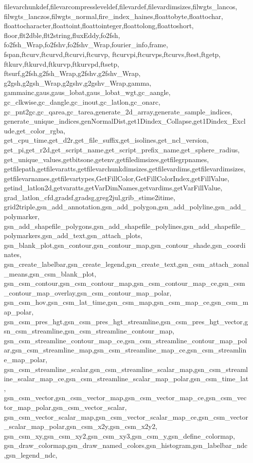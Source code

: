 {{	filevarchunkdef,filevarcompressleveldef,filevardef,filevardimsizes,filwgts_lancos,
	filwgts_lanczos,filwgts_normal,fire_index_haines,floattobyte,floattochar,
	floattocharacter,floattoint,floattointeger,floattolong,floattoshort,
	floor,flt2dble,flt2string,fluxEddy,fo2fsh,
	fo2fsh_Wrap,fo2fshv,fo2fshv_Wrap,fourier_info,frame,
	fspan,ftcurv,ftcurvd,ftcurvi,ftcurvp,
	ftcurvpi,ftcurvps,ftcurvs,ftest,ftgetp,
	ftkurv,ftkurvd,ftkurvp,ftkurvpd,ftsetp,
	ftsurf,g2fsh,g2fsh_Wrap,g2fshv,g2fshv_Wrap,
	g2gsh,g2gsh_Wrap,g2gshv,g2gshv_Wrap,gamma,
	gammainc,gaus,gaus_lobat,gaus_lobat_wgt,gc_aangle,
	gc_clkwise,gc_dangle,gc_inout,gc_latlon,gc_onarc,
	gc_pnt2gc,gc_qarea,gc_tarea,generate_2d_array,generate_sample_indices,
	generate_unique_indices,genNormalDist,get1Dindex_Collapse,get1Dindex_Exclude,get_color_rgba,
	get_cpu_time,get_d2r,get_file_suffix,get_isolines,get_ncl_version,
	get_pi,get_r2d,get_script_name,get_script_prefix_name,get_sphere_radius,
	get_unique_values,getbitsone,getenv,getfiledimsizes,getfilegrpnames,
	getfilepath,getfilevaratts,getfilevarchunkdimsizes,getfilevardims,getfilevardimsizes,
	getfilevarnames,getfilevartypes,GetFillColor,GetFillColorIndex,getFillValue,
	getind_latlon2d,getvaratts,getVarDimNames,getvardims,getVarFillValue,
	grad_latlon_cfd,gradsf,gradsg,greg2jul,grib_stime2itime,
	grid2triple,gsn_add_annotation,gsn_add_polygon,gsn_add_polyline,gsn_add_polymarker,
	gsn_add_shapefile_polygons,gsn_add_shapefile_polylines,gsn_add_shapefile_polymarkers,gsn_add_text,gsn_attach_plots,
	gsn_blank_plot,gsn_contour,gsn_contour_map,gsn_contour_shade,gsn_coordinates,
	gsn_create_labelbar,gsn_create_legend,gsn_create_text,gsn_csm_attach_zonal_means,gsn_csm_blank_plot,
	gsn_csm_contour,gsn_csm_contour_map,gsn_csm_contour_map_ce,gsn_csm_contour_map_overlay,gsn_csm_contour_map_polar,
	gsn_csm_hov,gsn_csm_lat_time,gsn_csm_map,gsn_csm_map_ce,gsn_csm_map_polar,
	gsn_csm_pres_hgt,gsn_csm_pres_hgt_streamline,gsn_csm_pres_hgt_vector,gsn_csm_streamline,gsn_csm_streamline_contour_map,
	gsn_csm_streamline_contour_map_ce,gsn_csm_streamline_contour_map_polar,gsn_csm_streamline_map,gsn_csm_streamline_map_ce,gsn_csm_streamline_map_polar,
	gsn_csm_streamline_scalar,gsn_csm_streamline_scalar_map,gsn_csm_streamline_scalar_map_ce,gsn_csm_streamline_scalar_map_polar,gsn_csm_time_lat,
	gsn_csm_vector,gsn_csm_vector_map,gsn_csm_vector_map_ce,gsn_csm_vector_map_polar,gsn_csm_vector_scalar,
	gsn_csm_vector_scalar_map,gsn_csm_vector_scalar_map_ce,gsn_csm_vector_scalar_map_polar,gsn_csm_x2y,gsn_csm_x2y2,
	gsn_csm_xy,gsn_csm_xy2,gsn_csm_xy3,gsn_csm_y,gsn_define_colormap,
	gsn_draw_colormap,gsn_draw_named_colors,gsn_histogram,gsn_labelbar_ndc,gsn_legend_ndc,
}}
